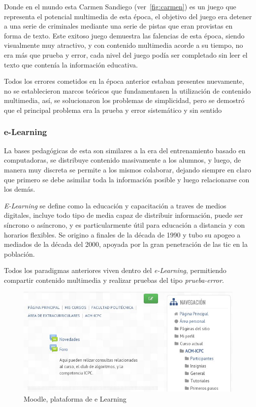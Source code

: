 Donde en el mundo esta Carmen Sandiego (ver~\ref{fig:carmen}) es un juego que
representa el potencial multimedia de esta época, el objetivo del juego era
detener a una serie de criminales mediante una serie de pistas que eran
provistas en forma de texto\cite{charsky:2010}. Este exitoso juego demuestra las
falencias de esta época, siendo visualmente muy atractivo, y con contenido
multimedia acorde a su tiempo, no era más que prueba y error, cada nivel del
juego podía ser completado sin leer el texto que contenía la información
educativa.

Todos los errores cometidos en la época anterior estaban presentes nuevamente,
no se establecieron marcos teóricos que fundamentasen la utilización de
contenido multimedia, así, se solucionaron los problemas de simplicidad, pero se
demostró que el principal problema era la prueba y error sistemático y sin
sentido\cite{egenfeldt2007third} 

\subsubsection{e-Learning}

La bases pedagógicas de esta son similares a la era del entrenamiento basado en
computadoras, se distribuye contenido masivamente a los alumnos, y luego, de
manera muy discreta se permite a los mismos colaborar, dejando siempre en claro
que primero se debe asimilar toda la información posible y luego relacionarse
con los demás\cite{leinonen:ict}.

\emph{E-Learning} se define como la educación y capacitación a traves de medios
digitales, incluye todo tipo de media capaz de distribuir información, puede ser
síncrono o asíncrono, y es particularmente útil para educación a distancia y con
horarios flexibles. Se origino a finales de la década de 1990 y tubo su apogeo a
mediados de la década del 2000, apoyada por la gran penetración de las \Gls{tic}
en la población\cite{punie:ict}.

Todos los paradigmas anteriores viven dentro del \emph{e-Learning}, permitiendo
compartir contenido multimedia y realizar pruebas del tipo \emph{prueba-error}. 

\begin{figure}[h] \centering \includegraphics[scale=0.5]{tics/moodle.jpg}
	\caption{Moodle, plataforma de e Learning} \label{fig:moodle}
\end{figure}

